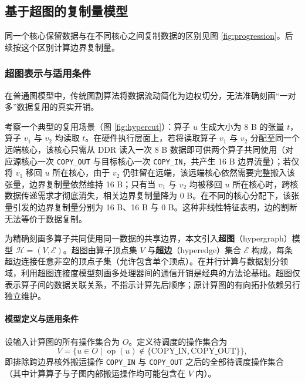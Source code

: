 \documentclass[anonymous,withtoc]{gmcm2026}
\begin{document}
\subsection{基于超图的复制量模型}

同一个核心保留数据与在不同核心之间复制数据的区别见图 \ref{fig:progression}。后续按这个区别计算边界复制量。

\subsubsection{超图表示与适用条件}

在普通图模型中，传统图割算法将数据流动简化为边权切分，无法准确刻画``一对多''数据复用的真实开销。

考察一个典型的复用场景（图 \ref{fig:hypercut}）：算子 \(u\) 生成大小为 8 B 的张量 \(t\)，算子 \(v_1\) 与 \(v_2\) 均读取 \(t\)。在硬件执行层面上，若将读取算子 \(v_1\) 与 \(v_2\) 分配至同一个远端核心，该核心只需从 DDR 读入一次 8 B 数据即可供两个算子共同使用（对应源核心一次 \texttt{COPY\_OUT} 与目标核心一次 \texttt{COPY\_IN}，共产生 16 B 边界流量）；若仅将 \(v_1\) 移回 \(u\) 所在核心，由于 \(v_2\) 仍驻留在远端，该远端核心依然需要完整搬入该张量，边界复制量依然维持 16 B；只有当 \(v_1\) 与 \(v_2\) 均被移回 \(u\) 所在核心时，跨核数据传递需求才彻底消失，相关边界复制量降为 0 B。在不同的核心分配下，该张量引发的边界复制量分别为 16 B、16 B 与 0 B。这种非线性特征表明，边的割断无法等价于数据复制。

为精确刻画多算子共同使用同一数据的共享边界，本文引入\textbf{超图}（hypergraph）模型 \(\mathcal{H} = (V, \mathcal{E})\)。超图由算子顶点集 \(V\) 与\textbf{超边}（hyperedge）集合 \(\mathcal{E}\) 构成，每条超边连接任意非空的顶点子集（允许包含单个顶点）\cite{ref5}。在并行计算与数据划分领域，利用超图连接度模型刻画多处理器间的通信开销是经典的方法论基础\cite{ref3}。超图仅表示算子间的数据关联关系，不指示计算先后顺序；原计算图的有向拓扑依赖另行独立维护。

\paragraph{模型定义与适用条件}

设输入计算图的所有操作集合为 \(O\)。定义待调度的操作集合为 \begin{equation}
V = \{u \in O \mid \operatorname{op}(u) \notin \{\text{COPY\_IN}, \text{COPY\_OUT}\}\},
\end{equation} 即排除跨边界核外搬运操作 \texttt{COPY\_IN} 与 \texttt{COPY\_OUT} 之后的全部待调度操作集合（其中计算算子与子图内部搬运操作均可能包含在 \(V\) 内）。
\end{document}
